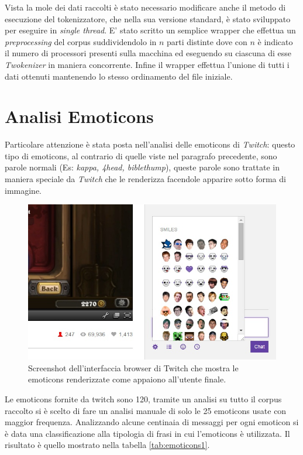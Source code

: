 \documentclass[a4paper,12pt,openright,twoside]{report}
\theoremstyle{definition}
\begin{document}
Vista la mole dei dati raccolti è stato necessario modificare anche il metodo di esecuzione del tokenizzatore, 
che nella sua versione standard, è stato sviluppato per eseguire in \emph{single thread}.
E' stato scritto un semplice wrapper che effettua un \emph{preprocessing} del corpus suddividendolo in $n$ parti distinte dove con $n$ è indicato il numero di processori presenti sulla macchina ed
eseguendo su ciascuna di esse \emph{Twokenizer} in maniera concorrente.
Infine il wrapper effettua l'unione di tutti i dati ottenuti mantenendo lo stesso ordinamento del file iniziale.

\section{Analisi Emoticons}
Particolare attenzione è stata posta nell'analisi delle emoticons di \emph{Twitch}: questo tipo di emoticons,
al contrario di quelle viste nel paragrafo precedente, sono parole normali (Es: \emph{kappa, 4head, biblethump}),
queste parole sono trattate in maniera speciale da \emph{Twitch} che le renderizza facendole apparire sotto forma di immagine.

\begin{figure}[ht]
	\centering
	\includegraphics[scale=0.5]{Immagini/TwitchEmotes.jpg}
	\caption{Screenshot dell'interfaccia browser di Twitch che mostra le emoticons renderizzate
	come appaiono all'utente finale.}
	\label{fig:TwitchEmotes}
\end{figure}

Le emoticons fornite da twitch sono 120, tramite un analisi su tutto il corpus raccolto si è scelto di fare un analisi
manuale di solo le 25 emoticons usate con maggior frequenza. Analizzando alcune centinaia di messaggi per ogni emoticon
si è data una classificazione alla tipologia di frasi in cui l'emoticons è utilizzata. Il risultato è
quello mostrato nella tabella \ref{tab:emoticons1}.
\end{document}
